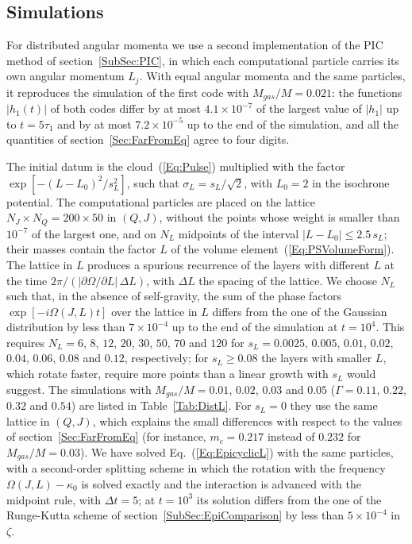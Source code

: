 \subsection{Simulations}
\label{SubSec:DistRuns}

For distributed angular momenta we use a second implementation of the PIC method of section~\ref{SubSec:PIC}, in which each computational particle carries its own angular momentum $L_j$. With equal angular momenta and the same particles, it reproduces the simulation of the first code with $M_{gas}/M = 0.021$: the functions $|h_1(t)|$ of both codes differ by at most $4.1\times 10^{-7}$ of the largest value of $|h_1|$ up to $t = 5\tau_1$ and by at most $7.2\times 10^{-5}$ up to the end of the simulation, and all the quantities of section~\ref{Sec:FarFromEq} agree to four digits.

The initial datum is the cloud~(\ref{Eq:Pulse}) multiplied with the factor $\exp[-(L - L_0)^2/s_L^2]$, such that $\sigma_L = s_L/\sqrt{2}$, with $L_0 = 2$ in the isochrone potential. The computational particles are placed on the lattice $N_J\times N_Q = 200\times 50$ in $(Q,J)$, without the points whose weight is smaller than $10^{-7}$ of the largest one, and on $N_L$ midpoints of the interval $|L - L_0|\leq 2.5\, s_L$; their masses contain the factor $L$ of the volume element~(\ref{Eq:PSVolumeForm}). The lattice in $L$ produces a spurious recurrence of the layers with different $L$ at the time $2\pi/(|\partial\Omega/\partial L|\,\Delta L)$, with $\Delta L$ the spacing of the lattice. We choose $N_L$ such that, in the absence of self-gravity, the sum of the phase factors $\exp[-i\Omega(J,L)t]$ over the lattice in $L$ differs from the one of the Gaussian distribution by less than $7\times 10^{-4}$ up to the end of the simulation at $t = 10^4$. This requires $N_L = 6$, $8$, $12$, $20$, $30$, $50$, $70$ and $120$ for $s_L = 0.0025$, $0.005$, $0.01$, $0.02$, $0.04$, $0.06$, $0.08$ and $0.12$, respectively; for $s_L\geq 0.08$ the layers with smaller $L$, which rotate faster, require more points than a linear growth with $s_L$ would suggest. The simulations with $M_{gas}/M = 0.01$, $0.02$, $0.03$ and $0.05$ ($\Gamma = 0.11$, $0.22$, $0.32$ and $0.54$) are listed in Table~\ref{Tab:DistL}. For $s_L = 0$ they use the same lattice in $(Q,J)$, which explains the small differences with respect to the values of section~\ref{Sec:FarFromEq} (for instance, $m_c = 0.217$ instead of $0.232$ for $M_{gas}/M = 0.03$). We have solved Eq.~(\ref{Eq:EpicyclicL}) with the same particles, with a second-order splitting scheme in which the rotation with the frequency $\Omega(J,L) - \kappa_0$ is solved exactly and the interaction is advanced with the midpoint rule, with $\Delta t = 5$; at $t = 10^3$ its solution differs from the one of the Runge-Kutta scheme of section~\ref{SubSec:EpiComparison} by less than $5\times 10^{-4}$ in $\zeta$.

